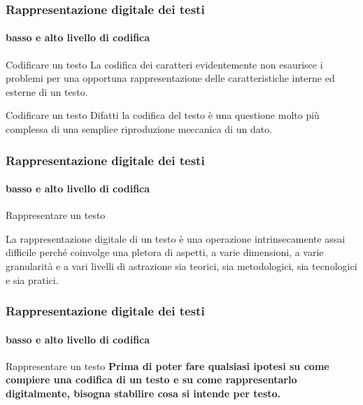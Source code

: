 \begin{frame}
	\frametitle{Rappresentazione digitale dei testi}
	\framesubtitle{basso e alto livello di codifica}
	\addtocounter{nframe}{1}

	\begin{block}{Codificare un testo}
		La codifica dei caratteri evidentemente non esaurisce i problemi per una opportuna rappresentazione delle caratteristiche interne ed esterne di un testo.
    \end{block}
    
    \begin{block}{Codificare un testo}
		Difatti la codifica del testo è una questione molto più complessa di una semplice riproduzione meccanica di un dato.
	\end{block}


\end{frame}


\begin{frame}
	\frametitle{Rappresentazione digitale dei testi}
	\framesubtitle{basso e alto livello di codifica}
	\addtocounter{nframe}{1}

	\begin{block}{Rappresentare un testo}
		
			La rappresentazione digitale di un testo è una operazione intrinsecamente assai difficile perché coinvolge una pletora di aspetti, a varie dimensioni, a varie granularità e a vari livelli di astrazione sia teorici, sia metodologici, sia tecnologici e sia pratici.
		
	\end{block}

\end{frame}

\begin{frame}
	\frametitle{Rappresentazione digitale dei testi}
	\framesubtitle{basso e alto livello di codifica}
	\addtocounter{nframe}{1}

	\begin{block}{Rappresentare un testo}
		\textbf{
			Prima di poter fare qualsiasi ipotesi su come compiere una codifica di un testo e su come rappresentarlo digitalmente, bisogna stabilire cosa si intende per testo.
		}
	\end{block}

\end{frame}



